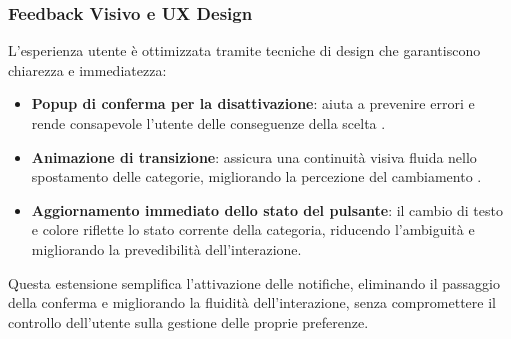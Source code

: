 \subsubsection{Feedback Visivo e UX Design}
L’esperienza utente è ottimizzata tramite tecniche di design che garantiscono chiarezza e immediatezza:

\begin{itemize}
    \item \textbf{Popup di conferma per la disattivazione}: aiuta a prevenire errori e rende consapevole l’utente delle conseguenze della scelta \cite{nielsen1995}.
    \item \textbf{Animazione di transizione}: assicura una continuità visiva fluida nello spostamento delle categorie, migliorando la percezione del cambiamento \cite{miller1956}.
    \item \textbf{Aggiornamento immediato dello stato del pulsante}: il cambio di testo e colore riflette lo stato corrente della categoria, riducendo l’ambiguità e migliorando la prevedibilità dell’interazione.
\end{itemize}

Questa estensione semplifica l’attivazione delle notifiche, eliminando il passaggio della conferma e migliorando la fluidità dell’interazione, senza compromettere il controllo dell’utente sulla gestione delle proprie preferenze.

